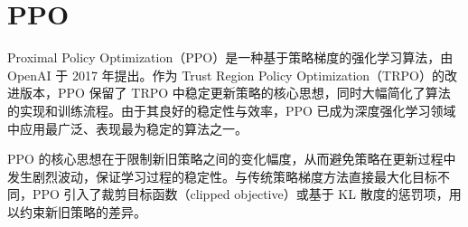 
\section{PPO}

Proximal Policy Optimization（PPO）\cite{yu2022surprising}是一种基于策略梯度的强化学习算法，由 OpenAI 于 2017 年提出。作为 Trust Region Policy Optimization（TRPO）的改进版本，PPO 保留了 TRPO 中稳定更新策略的核心思想，同时大幅简化了算法的实现和训练流程。由于其良好的稳定性与效率，PPO 已成为深度强化学习领域中应用最广泛、表现最为稳定的算法之一。


PPO 的核心思想在于限制新旧策略之间的变化幅度，从而避免策略在更新过程中发生剧烈波动，保证学习过程的稳定性。与传统策略梯度方法直接最大化目标不同，PPO 引入了裁剪目标函数（clipped objective）或基于 KL 散度的惩罚项，用以约束新旧策略的差异。

